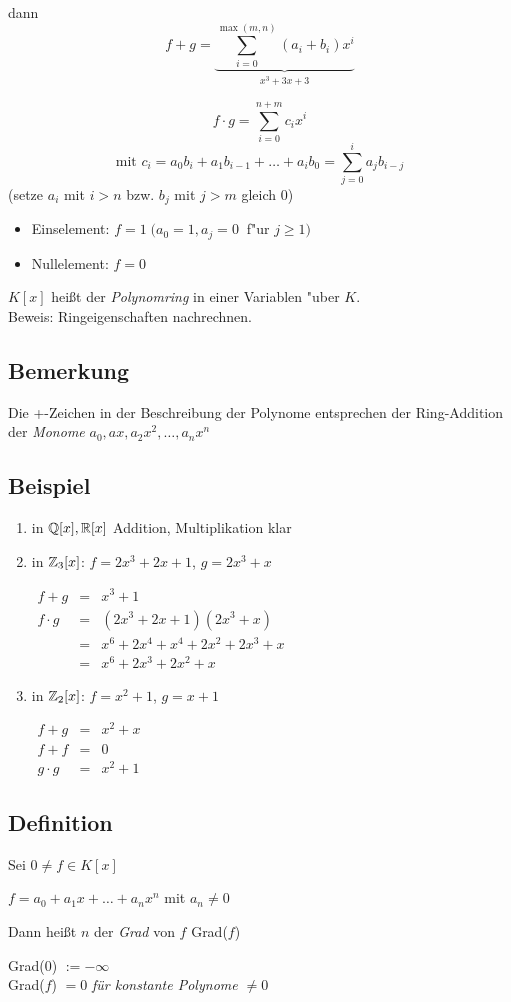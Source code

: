 dann \[f + g = \underbrace{\sum_{i=0}^{\max(m,n)}(a_i+b_i)x^i}_{x^3 + 3x +3}\]

\[f \cdot g = {\sum_{i=0}^{n+m} c_ix^i}\] 
\[\text{mit } c_i= a_0b_i+a_1b_{i-1}+ \dots + a_ib_0 = \sum_{j=0}^{i} a_jb_{i-j}  \tag{Faltungsprodukt}\]
(setze $a_i$ mit $i>n$ bzw. $b_j$ mit $j>m$ gleich 0)
\begin{itemize}
	\item
	Einselement: $f=1 \;(a_0=1, a_j = 0 \;\;$f"ur $ j\geq 1)$
	\item
	Nullelement: $f= 0$
\end{itemize}
$K[x]$ heißt der \emph{Polynomring} in einer Variablen "uber $K$.\\
Beweis: Ringeigenschaften nachrechnen.

\subsection{Bemerkung}
Die +-Zeichen in der Beschreibung der Polynome entsprechen der Ring-Addition der \emph{Monome} $a_0, ax, a_2x^2, \dots, a_nx^n$

\subsection{Beispiel}

\begin{enumerate}
	\item 
	in $\mathbb{Q}[x], \mathbb{R}[x]$ Addition, Multiplikation klar
	
	\item
	in $\mathbb{Z}_3[x]$:
	$f = 2x^3 + 2x + 1$,
	$g = 2x^3 + x$
	
	$\begin{array}{lcl}
	f + g &=& x^3 + 1 \\
	f \cdot g &=& (2x^3 + 2x + 1)(2x^3 + x) \\
	&=& x^6 + 2x^4 + x^4 + 2x^2 + 2x^3 + x \\
	&=& x^6 + 2x^3 + 2x^2 + x
	\end{array}$
	
	\item
	in $\mathbb{Z}_2[x]$:
	$f = x^2 + 1$,
	$g = x + 1$
	
	$\begin{array}{lcl}
	f+g &=& x^2 + x \\
	f+f &=& 0 \\
	g \cdot g &=& x^2 + 1
	\end{array}$
	
	
\end{enumerate}

\subsection[Definition: Grad eines Polynoms]{Definition}

Sei $0 \neq f \in K[x]$

$f=a_0 + a_1x + \dots + a_nx^n$ mit $a_n \neq 0$

Dann heißt $n$ der \emph{Grad} von $f$ Grad($f$)

Grad($0$) $:= - \infty$ \\
Grad($f$) $=0$ \quad \emph{für konstante Polynome $\neq 0$}